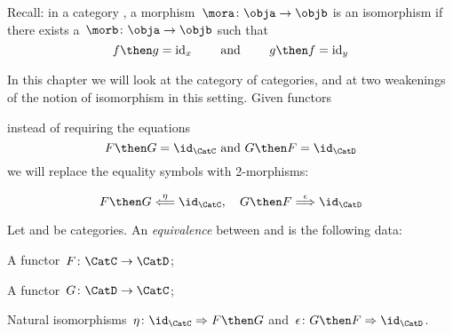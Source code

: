 
Recall: in a category \CatC, a morphism~$\mora \colon \obja \to \objb$ is an isomorphism if there exists a~$\morb \colon \obja \rightarrow \objb$ such that
\begin{equation*}
  f \then g = \text{id}_x \quad \quad \text{ and } \quad \quad g \then f = \text{id}_y
\end{equation*}


In this chapter we will look at the category \Category of categories, and at two weakenings of the notion of isomorphism in this setting.
Given functors
\begin{center}
\end{center}
instead of requiring the equations
\begin{equation*}
  F \then G = \id_\CatC  \text{ and } G \then F = \id_\CatD
\end{equation*}
we will replace the equality symbols with 2-morphisms:

\begin{equation*}
  F \then G \overset{\eta}{\Longleftarrow} \id_\CatC, \quad  G \then F \overset{\epsilon}{\Longrightarrow} \id_\CatD
\end{equation*}


\begin{center}
  \hspace{1cm}
\end{center}

\begin{ctdefinition}
  \label{def:cat-equivalence}
  Let \CatC and \CatD be categories. An \emph{equivalence} between \CatC and \CatD is the following data:
  \begin{compactenum}
    \item A functor~$F\colon  \CatC \to \CatD$;
    \item A functor~$G\colon \CatD \to \CatC$;
    \item Natural isomorphisms~$\eta \colon \id_\CatC \Rightarrow F \then G$ and~$\epsilon\colon  G \then F \Rightarrow \id_\CatD$.
  \end{compactenum}
\end{ctdefinition}



